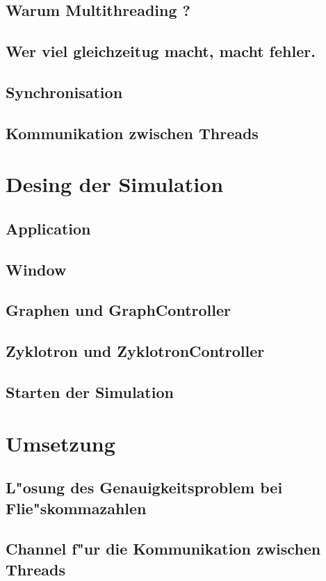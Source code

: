\documentclass[14pt, a4paper]{report}
\begin{document}
\section{Warum Multithreading ?}
\section{Wer viel gleichzeitug macht, macht fehler.}
\section{Synchronisation}
\section{Kommunikation zwischen Threads}

\chapter{Desing der Simulation}
\section{Application}
\section{Window} 
\section{Graphen und GraphController}
\section{Zyklotron und ZyklotronController}
\section{Starten der Simulation}

\chapter{Umsetzung}
\section{L"osung des Genauigkeitsproblem bei Flie"skommazahlen}
\section{Channel f"ur die Kommunikation zwischen Threads}
\end{document}
